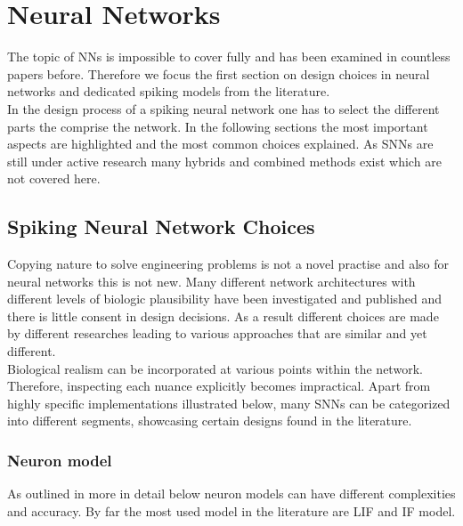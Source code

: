 \section{Neural Networks}
The topic of \acp{NN} is impossible to cover fully and has been examined in countless papers before. Therefore we focus the first section on design choices in neural networks and dedicated spiking models from the literature.\\
In the design process of a spiking neural network one has to select the different parts the comprise the network. In the following sections the most important aspects are highlighted and the most common choices explained. As \acp{SNN} are still under active research many hybrids and combined methods exist which are not covered here.\\
\subsection{Spiking Neural Network Choices}

Copying nature to solve engineering problems is not a novel practise and also for neural networks this is not new. Many different network architectures with different levels of biologic plausibility have been investigated and published and there is little consent in design decisions. As a result different choices are made by different researches leading to various approaches that are similar and yet different.\\
Biological realism can be incorporated at various points within the network. Therefore, inspecting each nuance explicitly becomes impractical. Apart from highly specific implementations illustrated below, many \acp{SNN} can be categorized into different segments, showcasing certain designs found in the literature.\\

\subsubsection{Neuron model}
As outlined in more in detail below neuron models can have different complexities and accuracy. By far the most used model in the literature are \ac{LIF} and \ac{IF} model.\\

